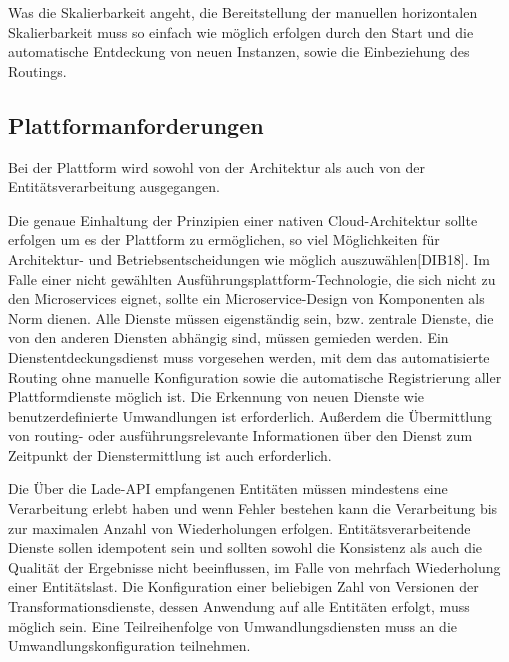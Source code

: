 Was die Skalierbarkeit angeht, die Bereitstellung der manuellen horizontalen Skalierbarkeit muss so einfach wie möglich erfolgen durch den Start und die automatische Entdeckung von neuen Instanzen, sowie die Einbeziehung des Routings.

\subsection{Plattformanforderungen}
\label{subsec:PlattformAnforderungen}

Bei der Plattform wird sowohl von der Architektur als auch von der Entitätsverarbeitung ausgegangen.

Die genaue Einhaltung der Prinzipien einer nativen Cloud-Architektur sollte erfolgen um es der Plattform zu ermöglichen, so viel Möglichkeiten für Architektur- und Betriebsentscheidungen wie möglich auszuwählen[DIB18]. Im Falle einer nicht gewählten Ausführungsplattform-Technologie, die sich nicht zu den Microservices eignet, sollte ein Microservice-Design von Komponenten als Norm dienen. Alle Dienste müssen eigenständig sein, bzw. zentrale Dienste, die von den anderen Diensten abhängig sind, müssen gemieden werden. Ein Dienstentdeckungsdienst muss vorgesehen werden, mit dem das automatisierte Routing ohne manuelle Konfiguration sowie die automatische Registrierung aller Plattformdienste möglich ist. Die Erkennung von neuen Dienste wie benutzerdefinierte Umwandlungen ist erforderlich. Außerdem die Übermittlung von routing- oder ausführungsrelevante Informationen über den Dienst zum Zeitpunkt der Dienstermittlung ist auch erforderlich.

Die Über die Lade-API empfangenen Entitäten müssen mindestens eine Verarbeitung erlebt haben und wenn Fehler bestehen kann die Verarbeitung bis zur maximalen Anzahl von Wiederholungen erfolgen. Entitätsverarbeitende Dienste sollen idempotent sein und sollten sowohl die Konsistenz als auch die Qualität der Ergebnisse nicht beeinflussen, im Falle von mehrfach Wiederholung einer Entitätslast. Die Konfiguration einer beliebigen Zahl von Versionen der Transformationsdienste, dessen Anwendung auf alle Entitäten erfolgt, muss möglich sein. Eine Teilreihenfolge von Umwandlungsdiensten muss an die Umwandlungskonfiguration teilnehmen.


